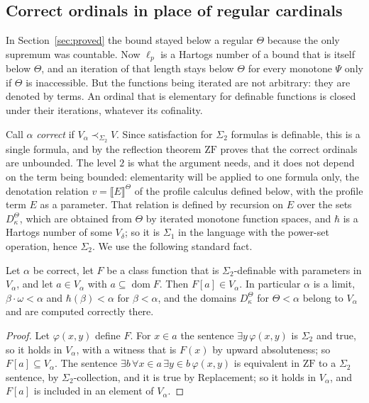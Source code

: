 \documentclass[10pt]{article}
\newcommand{\ZF}{\mathrm{ZF}}
\newcommand{\dom}{\operatorname{dom}}
\newcommand{\sem}[1]{\llbracket #1\rrbracket}
\begin{document}
\subsection{Correct ordinals in place of regular cardinals}

In Section~\ref{sec:proved} the bound stayed below a regular $\Theta$
because the only supremum was countable. Now $\ell_p$ is a Hartogs number
of a bound that is itself below $\Theta$, and an iteration of that length
stays below $\Theta$ for every monotone $\Psi$ only if $\Theta$ is
inaccessible. But the functions being iterated are not arbitrary: they
are denoted by terms. An ordinal that is elementary for definable
functions is closed under their iterations, whatever its cofinality.

Call $\alpha$ \emph{correct} if $V_\alpha\prec_{\Sigma_2}V$. Since satisfaction
for $\Sigma_2$ formulas is definable, this is a single formula, and by the
reflection theorem $\ZF$ proves that the correct ordinals are unbounded.
The level $2$ is what the argument needs, and it does not depend on the
term being bounded: elementarity will be applied to one formula only,
the denotation relation $v=\sem E^\Theta$ of the profile calculus defined
below, with the profile term $E$ as a parameter. That relation is
defined by recursion on $E$ over the sets $D^\Theta_\kappa$, which are
obtained from $\Theta$ by iterated monotone function spaces, and
$\hbar$ is a Hartogs number of some $V_\delta$; so it is $\Sigma_1$ in the
language with the power-set operation, hence $\Sigma_2$. We use the
following standard fact.

\begin{lemma}\label{lem:correct}
Let $\alpha$ be correct, let $F$ be a class function that is
$\Sigma_2$-definable with parameters in $V_\alpha$, and let $a\in V_\alpha$ with
$a\subseteq\dom F$. Then $F[a]\in V_\alpha$. In particular $\alpha$ is a limit,
$\beta\cdot\omega<\alpha$ and $\hbar(\beta)<\alpha$ for $\beta<\alpha$, and the
domains $D^\Theta_\kappa$ for $\Theta<\alpha$ belong to $V_\alpha$ and are
computed correctly there.
\end{lemma}
\begin{proof}
Let $\varphi(x,y)$ define $F$. For $x\in a$ the sentence $\exists y\,\varphi(x,y)$
is $\Sigma_2$ and true, so it holds in $V_\alpha$, with a witness that is
$F(x)$ by upward absoluteness; so $F[a]\subseteq V_\alpha$. The sentence
$\exists b\,\forall x{\in}a\,\exists y{\in}b\,\varphi(x,y)$ is equivalent in
$\ZF$ to a $\Sigma_2$ sentence, by $\Sigma_2$-collection, and it is true by
Replacement; so it holds in $V_\alpha$, and $F[a]$ is included in an element
of $V_\alpha$.
\end{proof}
\end{document}
